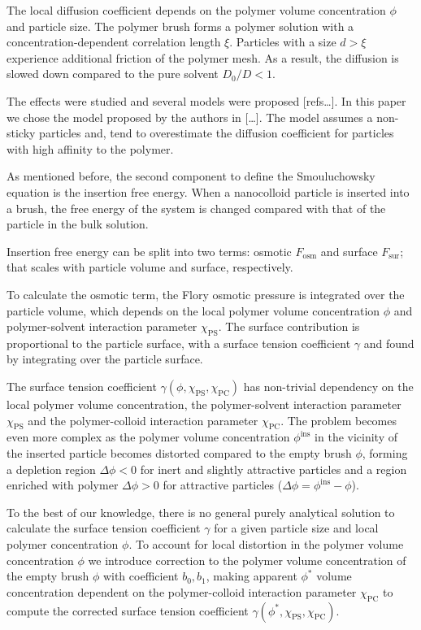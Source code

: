 \documentclass[12pt, a4paper]{article}
\begin{document}
The local diffusion coefficient depends on the polymer volume concentration $\phi$ and particle size. 
The polymer brush forms a polymer solution with a concentration-dependent correlation length $\xi$. 
Particles with a size $d>\xi$ experience additional friction of the polymer mesh. 
As a result, the diffusion is slowed down compared to the pure solvent $D_0/D<1$.

The effects were studied and several models were proposed [refs\dots]. 
In this paper we chose the model proposed by the authors in [\dots].
The model assumes a non-sticky particles and, tend to overestimate the diffusion coefficient for particles with high affinity to the polymer.

As mentioned before, the second component to define the Smouluchowsky equation is the insertion free energy. 
When a nanocolloid particle is inserted into a brush, the free energy of the system is changed compared with that of the particle in the bulk solution. 

Insertion free energy can be split into two terms: osmotic $F_{\textrm{osm}}$ and surface $F_{\textrm{sur}}$; that scales with particle volume and surface, respectively.

To calculate the osmotic term, the Flory osmotic pressure is integrated over the particle volume, which depends on the local polymer volume concentration $\phi$ and polymer-solvent interaction parameter $\chi_{\textrm{PS}}$.
The surface contribution is proportional to the particle surface, with a surface tension coefficient $\gamma$ and found by integrating over the particle surface.

The surface tension coefficient $\gamma(\phi, \chi_{\textrm{PS}}, \chi_{\textrm{PC}})$ has non-trivial dependency on the local polymer volume concentration, the polymer-solvent interaction parameter $\chi_{\textrm{PS}}$ and the polymer-colloid interaction parameter $\chi_{\textrm{PC}}$.
The problem becomes even more complex as the polymer volume concentration $\phi^{\textrm{ins}}$ in the vicinity of the inserted particle becomes distorted compared to the empty brush $\phi$, forming a depletion region $\Delta \phi <0$ for inert and slightly attractive particles and a region enriched with polymer $\Delta \phi >0$ for attractive particles ($\Delta \phi = \phi^{\textrm{ins}} - \phi$).

To the best of our knowledge, there is no general purely analytical solution to calculate the surface tension coefficient $\gamma$ for a given particle size and local polymer concentration $\phi$.
To account for local distortion in the polymer volume concentration $\phi$ we introduce correction to the polymer volume concentration of the empty brush $\phi$ with coefficient $b_0, b_1$, making apparent $\phi^{\ast}$ volume concentration dependent on the polymer-colloid interaction parameter $\chi_{\textrm{PC}}$ to compute the corrected surface tension coefficient $\gamma(\phi^{\ast},\chi_{\textrm{PS}}, \chi_{\textrm{PC}})$.
\end{document}
